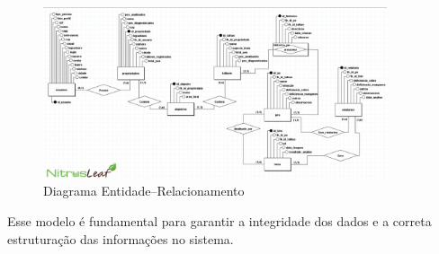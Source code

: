 \begin{figure}[H]
\centering
\caption{Diagrama Entidade–Relacionamento}
\label{fig:diagrama-der}
\includegraphics[width=0.9\textwidth]{Images/DiagramaDER.jpg}
\end{figure}

Esse modelo é fundamental para garantir a integridade dos dados e a correta
estruturação das informações no sistema.
\medskip